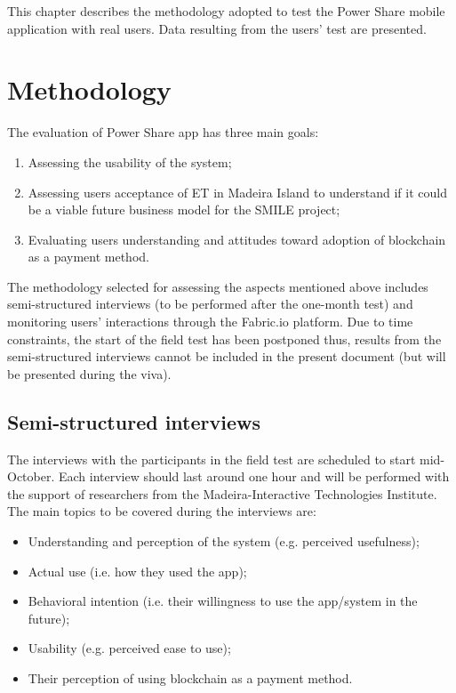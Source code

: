 \cleardoublepage
\label{chap:evaluation}
This chapter describes the methodology adopted to test the Power Share mobile application with real users. Data resulting from the users’ test are presented. 

\section{Methodology}

The evaluation of Power Share app has three main goals:


\begin{enumerate}
    \item Assessing the usability of the system;
    \item Assessing users acceptance of \ac{ET} in Madeira Island to understand if it could be a viable future business model for the SMILE project;
    \item Evaluating users understanding and attitudes toward adoption of blockchain as a payment method.
\end{enumerate}


The methodology selected for assessing the aspects mentioned above includes semi-structured interviews (to be performed after the one-month test) and monitoring users’ interactions through the Fabric.io platform. Due to time constraints, the start of the field test has been postponed thus, results from the semi-structured interviews cannot be included in the present document (but will be presented during the viva). 


\subsection{Semi-structured interviews}

The interviews with the participants in the field test are scheduled to start mid-October. Each interview should last around one hour and will be performed with the support of researchers from the Madeira-Interactive Technologies Institute.
The main topics to be covered during the interviews are:
\begin{itemize}
    \item Understanding and perception of the system (e.g. perceived usefulness);
    \item Actual use (i.e. how they used the app);
    \item Behavioral intention (i.e. their willingness to use the app/system in the future);
    \item Usability (e.g. perceived ease to use);
    \item Their perception of using blockchain as a payment method.
\end{itemize}

